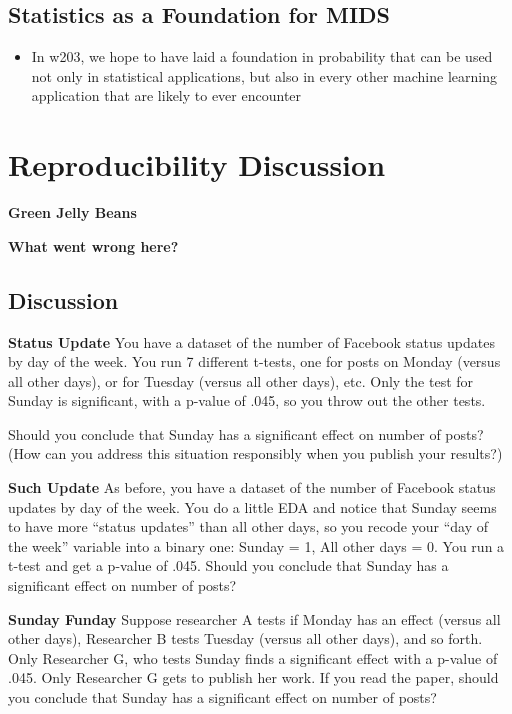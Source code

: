 \documentclass[
]{book}
\providecommand{\tightlist}{%
  \setlength{\itemsep}{0pt}\setlength{\parskip}{0pt}}
\theoremstyle{definition}
\theoremstyle{definition}
\theoremstyle{definition}
\theoremstyle{definition}
\theoremstyle{remark}
\begin{document}
\hypertarget{statistics-as-a-foundation-for-mids}{%
\subsection{Statistics as a Foundation for MIDS}\label{statistics-as-a-foundation-for-mids}}

\begin{itemize}
\tightlist
\item
  In w203, we hope to have laid a foundation in probability that can be used not only in statistical applications, but also in every other machine learning application that are likely to ever encounter
\end{itemize}

\hypertarget{reproducibility-discussion}{%
\section{Reproducibility Discussion}\label{reproducibility-discussion}}

\textbf{Green Jelly Beans}

\textbf{What went wrong here?}

\hypertarget{discussion-3}{%
\subsection{Discussion}\label{discussion-3}}

\textbf{Status Update}
You have a dataset of the number of Facebook status updates by day of the week. You run 7 different t-tests, one for posts on Monday (versus all other days), or for Tuesday (versus all other days), etc. Only the test for Sunday is significant, with a p-value of .045, so you throw out the other tests.

Should you conclude that Sunday has a significant effect on number of posts? (How can you address this situation responsibly when you publish your results?)

\textbf{Such Update}
As before, you have a dataset of the number of Facebook status updates by day of the week. You do a little EDA and notice that Sunday seems to have more ``status updates'' than all other days, so you recode your ``day of the week'' variable into a binary one: Sunday = 1, All other days = 0. You run a t-test and get a p-value of .045. Should you conclude that Sunday has a significant effect on number of posts?

\textbf{Sunday Funday}
Suppose researcher A tests if Monday has an effect (versus all other days), Researcher B tests Tuesday (versus all other days), and so forth. Only Researcher G, who tests Sunday finds a significant effect with a p-value of .045. Only Researcher G gets to publish her work. If you read the paper, should you conclude that Sunday has a significant effect on number of posts?
\end{document}
